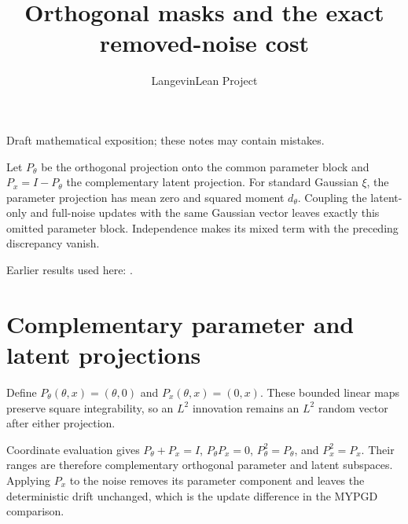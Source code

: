 \documentclass[11pt,a4paper]{article}
\title{\texorpdfstring{Orthogonal masks and the exact removed-noise cost}{Orthogonal masks and the exact removed-noise cost}}
\author{LangevinLean Project}
\date{}
\begin{document}
\maketitle
Draft mathematical exposition; these notes may contain mistakes.


Let \(P_\theta\) be the orthogonal projection onto the common parameter block and \(P_x=I-P_\theta\) the complementary latent projection. For standard Gaussian \(\xi\), the parameter projection has mean zero and squared moment \(d_\theta\). Coupling the latent-only and full-noise updates with the same Gaussian vector leaves exactly this omitted parameter block. Independence makes its mixed term with the preceding discrepancy vanish.



Earlier results used here: \cite[Section~3.10]{LangevinLean2026ULALSI}.

\section{\texorpdfstring{Complementary parameter and latent projections}{Complementary parameter and latent projections}}


Define \(P_\theta(\theta,x)=(\theta,0)\) and \(P_x(\theta,x)=(0,x)\). These bounded linear maps preserve square integrability, so an \(L^2\) innovation remains an \(L^2\) random vector after either projection.



Coordinate evaluation gives \(P_\theta+P_x=I\), \(P_\theta P_x=0\), \(P_\theta^2=P_\theta\), and \(P_x^2=P_x\). Their ranges are therefore complementary orthogonal parameter and latent subspaces. Applying \(P_x\) to the noise removes its parameter component and leaves the deterministic drift unchanged, which is the update difference in the MYPGD comparison.
\end{document}
